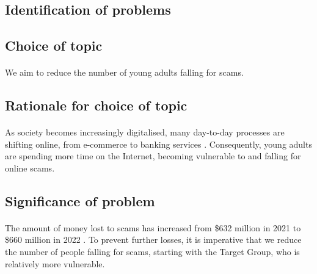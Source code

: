 \documentclass[a4paper]{article}
\begin{document}

\begin{abstract}
  \noindent
  ...?
\end{abstract}

\newpage


\tableofcontents

\newpage


\begin{multicols}{2}

    \section{Identification of problems}
    \subsection{Choice of topic}
    \paragraph{} We aim to reduce the number of young adults falling for scams.
    \subsection{Rationale for choice of topic}
    \paragraph{} As society becomes increasingly digitalised,
    many day-to-day processes are shifting online, from
    e-commerce \parencite{ITA.2022} to banking services
    \parencite{Statista.2023}. Consequently, young adults are spending
    more time on the Internet, becoming vulnerable to and falling for
    online scams.

    \subsection{Significance of problem}
    \paragraph{} The amount of money lost to scams has
    increased from \$632 million in 2021 to \$660 million in 2022
    \parencite{Chua.2023}. To prevent further losses, it is imperative
    that we reduce the number of people falling for scams, starting with
    the Target Group, who is relatively more vulnerable.


\end{multicols}
\end{document}

